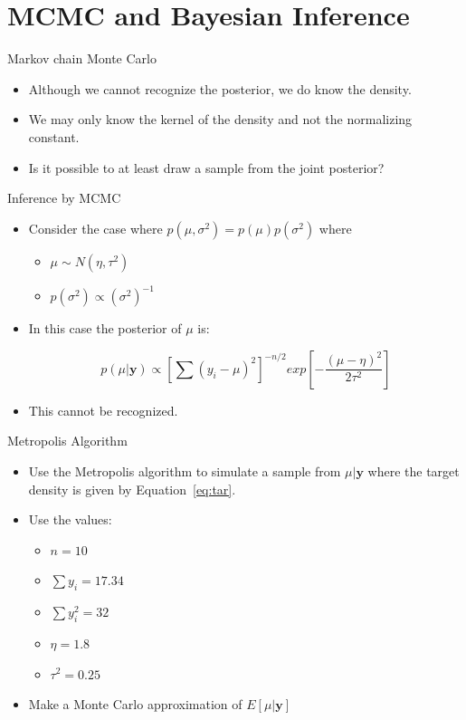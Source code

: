 \documentclass[10pt]{beamer}
\begin{document}
\section{MCMC and Bayesian Inference}
\begin{frame}{Markov chain Monte Carlo}
  \begin{itemize}
  \item Although we cannot recognize the posterior, we do know the density.

  \item We may only know the kernel of the density and not the normalizing constant.

  \item Is it possible to at least draw a sample from the joint posterior?
  \end{itemize}
\end{frame}
\begin{frame}{Inference by MCMC}
  \begin{itemize}
  \item Consider the case where $p(\mu,\sigma^2)=p(\mu)p(\sigma^2)$ where

    \begin{itemize}
    \item $\mu\sim N(\eta,\tau^2)$
    \item $p(\sigma^2)\propto (\sigma^2)^{-1}$
    \end{itemize}

  \item In this case the posterior of $\mu$ is:

    \begin{equation}
      p(\mu|{\bm y})\propto
      \left[\sum (y_i-\mu)^2\right]^{-n/2}
      exp\left[-\frac{(\mu-\eta)^2}{2\tau^2}\right]
      \label{eq:tar}
    \end{equation}

  \item This cannot be recognized.
  \end{itemize}
\end{frame}
\begin{frame}{Metropolis Algorithm}
  \begin{itemize}
  \item Use the Metropolis algorithm to simulate a sample from $\mu|{\bm y}$ where the target density is given by Equation~\ref{eq:tar}.

  \item Use the values:
    \begin{itemize}
    \item $n=10$
    \item $\sum y_i=17.34$
    \item $\sum y^2_i=32$
    \item $\eta=1.8$
    \item $\tau^2=0.25$
    \end{itemize}

  \item Make a Monte Carlo approximation of $E[\mu|{\bm y}]$
  \end{itemize}
\end{frame}
\end{document}
